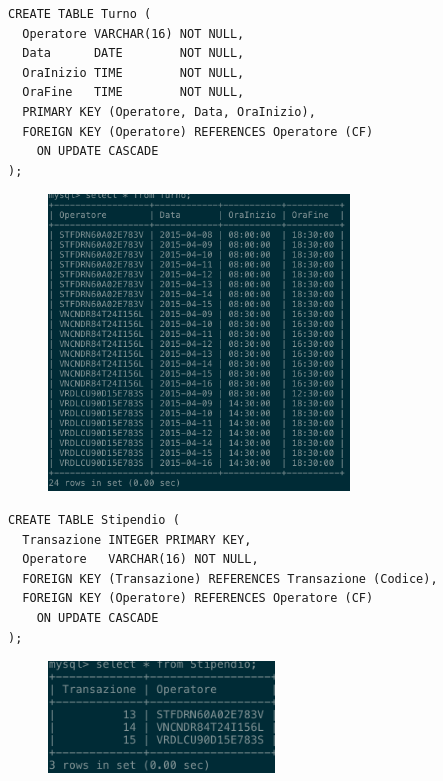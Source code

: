     \begin{lstlisting}
CREATE TABLE Turno (
  Operatore VARCHAR(16) NOT NULL,
  Data      DATE        NOT NULL,
  OraInizio TIME        NOT NULL,
  OraFine   TIME        NOT NULL,
  PRIMARY KEY (Operatore, Data, OraInizio),
  FOREIGN KEY (Operatore) REFERENCES Operatore (CF)
    ON UPDATE CASCADE
);
    \end{lstlisting}
    \begin{figure}[H]
      \centering
      \includegraphics[width=8cm]{images/screenshots/schema/turno.png}
    \end{figure}

    \begin{lstlisting}
CREATE TABLE Stipendio (
  Transazione INTEGER PRIMARY KEY,
  Operatore   VARCHAR(16) NOT NULL,
  FOREIGN KEY (Transazione) REFERENCES Transazione (Codice),
  FOREIGN KEY (Operatore) REFERENCES Operatore (CF)
    ON UPDATE CASCADE
);
    \end{lstlisting}
    \begin{figure}[H]
      \centering
      \includegraphics[width=6cm]{images/screenshots/schema/stipendio.png}
    \end{figure}

